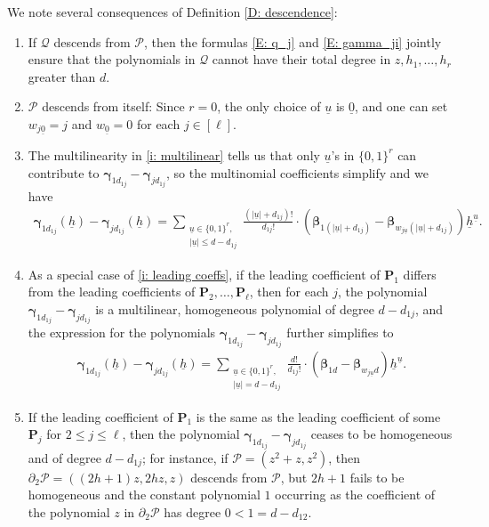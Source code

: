 \documentclass[11pt]{amsart}
\theoremstyle{definition}
\newcommand{\CP}{{\mathcal P}}
\newcommand{\CQ}{{\mathcal Q}}
\newcommand{\bp}{{\mathbf{P}}}
\newcommand{\p}{{\mathbf{P}}}
\newcommand{\bgamma}{{\boldsymbol{\gamma}}}
\newcommand{\bbeta}{{\boldsymbol{\beta}}}
\newcommand{\uh}{{\underline{h}}}
\newcommand{\uu}{{\underline{u}}}
\begin{document}
      
      We note several consequences of Definition \ref{D: descendence}: 
      \begin{enumerate}
	      \item If $\CQ$ descends from $\CP$, then the formulas \eqref{E: q_j} and \eqref{E: gamma_ji} jointly ensure that the polynomials in $\CQ$ cannot have their total degree in $z, h_1, \ldots, h_r$ greater than $d$.
	       \item $\CP$ descends from itself: Since $r=0$, the only choice of $\uu$ is $\underline{0}$, and one can set $w_{j\underline{0}}=j$ and $w_{\underline{0}} = 0$ for each $j\in[\ell]$.
	      \item The multilinearity in \eqref{i: multilinear} tells us that only $\uu$'s in $\{0,1\}^r$ can contribute to $\bgamma_{1d_{1j}}-\bgamma_{jd_{1j}}$, so the multinomial coefficients simplify and we have
          \begin{align*}
              \bgamma_{1d_{1j}}(\uh)-\bgamma_{jd_{1j}}(\uh) = \sum_{\substack{\uu\in \{0,1\}^r,\\ |\uu|\leq d-d_{1j}}} \frac{(|\uu|+d_{1j})!}{d_{1j}!}\cdot (\bbeta_{1(|\uu|+d_{1j})}-\bbeta_{w_{j\uu}(|\uu|+d_{1j})})\uh^\uu.
          \end{align*}
          \item\label{i: homogeneity} As a special case of \eqref{i: leading coeffs}, if the leading coefficient of $\bp_1$ differs from the leading coefficients of $\bp_2, \ldots, \bp_\ell$, then for each $j$, the polynomial $\bgamma_{1d_{1j}}-\bgamma_{jd_{1j}}$ is a multilinear, homogeneous polynomial of degree $d-d_{1j}$,
        and the expression for the polynomials $\bgamma_{1d_{1j}}-\bgamma_{jd_{1j}}$ further simplifies to
          \begin{align*}
              \bgamma_{1d_{1j}}(\uh)-\bgamma_{jd_{1j}}(\uh) = \sum_{\substack{\uu\in \{0,1\}^r,\\ |\uu|= d-d_{1j}}} \frac{d!}{d_{1j}!}\cdot (\bbeta_{1d}-\bbeta_{w_{j\uu}d})\uh^\uu.              
          \end{align*}
          \item If the leading coefficient of $\p_1$ is the same as the leading coefficient of some $\p_j$ for $2 \leq j \leq \ell$, then the polynomial $\bgamma_{1d_{1j}}-\bgamma_{jd_{1j}}$ ceases to be homogeneous and of degree $d-d_{1j}$; for instance, if $\CP = (z^2+z, z^2)$, then $\partial_2 \CP = ((2h+1)z, 2h z, z)$ descends from $\CP$, but $2h+1$ fails to be homogeneous and {the constant polynomial $1$ occurring as the coefficient of the polynomial $z$ in $\partial_2 \CP$} has degree $0<1=d-d_{12}$.
      \end{enumerate}
       
\end{document}

